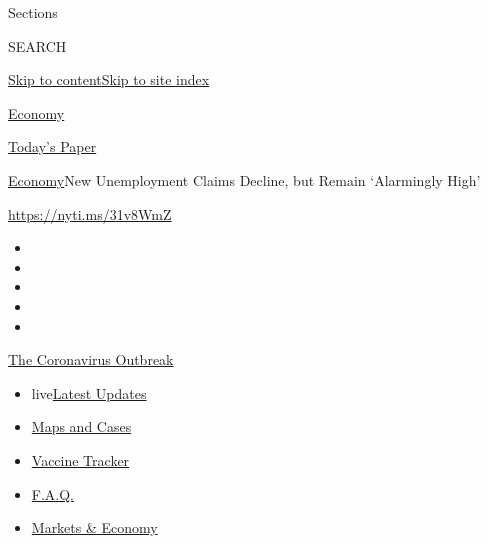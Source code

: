 Sections

SEARCH

\protect\hyperlink{site-content}{Skip to
content}\protect\hyperlink{site-index}{Skip to site index}

\href{https://www.nytimes.com/section/business/economy}{Economy}

\href{https://myaccount.nytimes.com/auth/login?response_type=cookie\&client_id=vi}{}

\href{https://www.nytimes.com/section/todayspaper}{Today's Paper}

\href{/section/business/economy}{Economy}\textbar{}New Unemployment
Claims Decline, but Remain `Alarmingly High'

\href{https://nyti.ms/31v8WmZ}{https://nyti.ms/31v8WmZ}

\begin{itemize}
\item
\item
\item
\item
\item
\end{itemize}

\href{https://www.nytimes.com/news-event/coronavirus?action=click\&pgtype=Article\&state=default\&region=TOP_BANNER\&context=storylines_menu}{The
Coronavirus Outbreak}

\begin{itemize}
\tightlist
\item
  live\href{https://www.nytimes.com/2020/08/08/world/coronavirus-updates.html?action=click\&pgtype=Article\&state=default\&region=TOP_BANNER\&context=storylines_menu}{Latest
  Updates}
\item
  \href{https://www.nytimes.com/interactive/2020/us/coronavirus-us-cases.html?action=click\&pgtype=Article\&state=default\&region=TOP_BANNER\&context=storylines_menu}{Maps
  and Cases}
\item
  \href{https://www.nytimes.com/interactive/2020/science/coronavirus-vaccine-tracker.html?action=click\&pgtype=Article\&state=default\&region=TOP_BANNER\&context=storylines_menu}{Vaccine
  Tracker}
\item
  \href{https://www.nytimes.com/interactive/2020/world/coronavirus-tips-advice.html?action=click\&pgtype=Article\&state=default\&region=TOP_BANNER\&context=storylines_menu}{F.A.Q.}
\item
  \href{https://www.nytimes.com/live/2020/08/07/business/stock-market-today-coronavirus?action=click\&pgtype=Article\&state=default\&region=TOP_BANNER\&context=storylines_menu}{Markets
  \& Economy}
\end{itemize}

